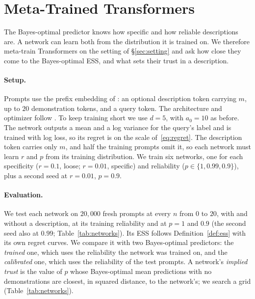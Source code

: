 \documentclass{article}
\begin{document}
\section{Meta-Trained Transformers}\label{sec:networks}
The Bayes-optimal predictor knows how specific and how reliable descriptions are. A network can learn both from the distribution it is trained on. We therefore meta-train Transformers on the setting of \S\ref{sec:setting} and ask how close they come to the Bayes-optimal ESS, and what sets their trust in a description.

\paragraph{Setup.} Prompts use the prefix embedding of \citet{huangge2025}: an optional description token carrying $m$, up to $20$ demonstration tokens, and a query token. The architecture and optimizer follow \citet{garg2022}. To keep training short we use $d = 5$, with $a_0 = 10$ as before. The network outputs a mean and a log variance for the query's label and is trained with log loss, so its regret is on the scale of~\eqref{eq:regret}. The description token carries only $m$, and half the training prompts omit it, so each network must learn $r$ and $p$ from its training distribution. We train six networks, one for each specificity ($r = 0.1$, loose; $r = 0.01$, specific) and reliability ($p \in \{1, 0.99, 0.9\}$), plus a second seed at $r = 0.01$, $p = 0.9$.

\paragraph{Evaluation.} We test each network on $20{,}000$ fresh prompts at every $n$ from $0$ to $20$, with and without a description, at its training reliability and at $p = 1$ and $0.9$ (the second seed also at $0.99$; Table~\ref{tab:networks}). Its ESS follows Definition~\ref{def:ess} with its own regret curves. We compare it with two Bayes-optimal predictors: the \emph{trained} one, which uses the reliability the network was trained on, and the \emph{calibrated} one, which uses the reliability of the test prompts. A network's \emph{implied trust} is the value of $p$ whose Bayes-optimal mean predictions with no demonstrations are closest, in squared distance, to the network's; we search a grid (Table~\ref{tab:networks}).
\end{document}
